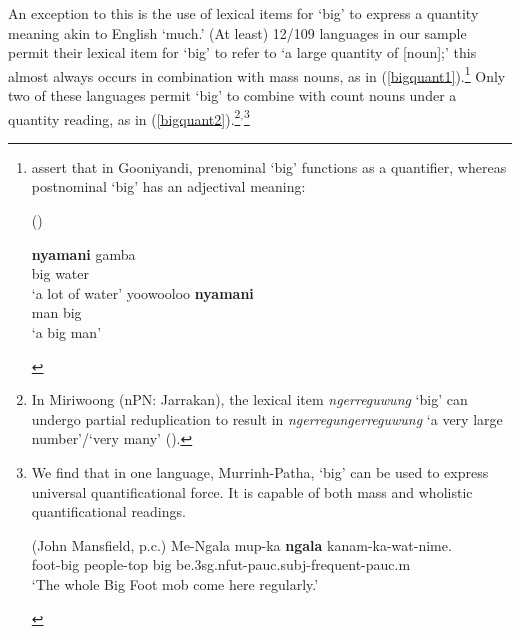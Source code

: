\documentclass[12pt,egregdoesnotlikesansseriftitles]{scrartcl}
\begin{document}
An exception to this is the use of lexical items for `big' to express a quantity meaning akin to English `much.' (At least) 12/109 languages in our sample permit their lexical item for `big' to refer to `a large quantity of [noun];' this almost always occurs in combination with mass nouns, as in (\ref{bigquant1}).\footnote{\citet[37]{louagieverstraete16} assert that in Gooniyandi, prenominal `big' functions as a quantifier, whereas postnominal `big' has an adjectival meaning:
    \vspace{-2mm}
    \begin{exe}
       (\citealt{mcgregor90})
      \begin{xlist}
      \begin{multicols}{2}
        \ex \gll \textbf{nyamani} gamba\\
        big water \\
        \glt `a lot of water'%
        \ex \gll yoowooloo \textbf{nyamani} \\
        man big \\
        \glt `a big man' %
    \end{multicols}
      \end{xlist}
    \end{exe}
  } Only two of these languages permit `big' to combine with count nouns under a quantity reading, as in (\ref{bigquant2}).\footnote{
  In Miriwoong (nPN: Jarrakan), the lexical item \textit{ngerreguwung} `big' can undergo partial reduplication to result in \textit{ngerregungerreguwung} `a very large number'/`very many' (\citealt[43]{kofod78}).
  }$^{,}$\footnote{We find that in one language, Murrinh-Patha, `big' can be used to express universal quantificational force. It is capable of both mass and wholistic quantificational readings.
  
\begin{exe}
 (John Mansfield, p.c.)
\gll Me-Ngala mup-ka \textbf{ngala} kanam-ka-wat-nime.\\
foot-big people-{\sc top} big be.3{\sc sg.nfut-pauc.subj}-frequent-{\sc pauc.m}\\
`The whole Big Foot mob come here regularly.'
\end{exe}
}
\end{document}
